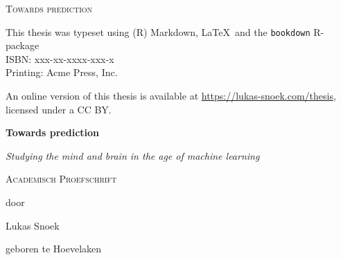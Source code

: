 \documentclass[11pt,american,a4paper,oneside,]{memoir} %
\newcommand{\CoverName}{cover} %
\begin{document}

\setlength{\abstitleskip}{-\absparindent}

\pagestyle{empty}
\renewcommand{\thepage}{\CoverName} %


\frontmatter
\thispagestyle{empty}
\def\drop{.1\textheight}

\vspace*{\drop}
\begin{center}
\Huge \textsc{Towards prediction}
\end{center}

\clearpage
\thispagestyle{empty}
\vspace*{\fill}
\begingroup %
\small
\setlength{\parskip}{\baselineskip} %
\setlength\parindent{0pt} %

This thesis was typeset using (R) Markdown, \LaTeX\ and the \verb+bookdown+ R-package
\\ ISBN: xxx-xx-xxxx-xxx-x\\ Printing: Acme Press, Inc.

An online version of this thesis is available at \url{https://lukas-snoek.com/thesis}, licensed under a CC BY.
\endgroup

\clearpage
\thispagestyle{empty}
\vspace*{\drop}
\begin{center}
\Huge\textbf{Towards prediction}\par
\vspace{\baselineskip}
\Large\textit{Studying the mind and brain in the age of machine learning}\par
\vfill %
\large \textsc{Academisch Proefschrift}\par
\vspace{\baselineskip}
\par %
\vspace{\baselineskip}
{\large door}\par
\vspace{\baselineskip}
{\Large Lukas Snoek}\par
\vspace{\baselineskip}
{\large geboren te Hoevelaken}
\end{center}
\end{document}
